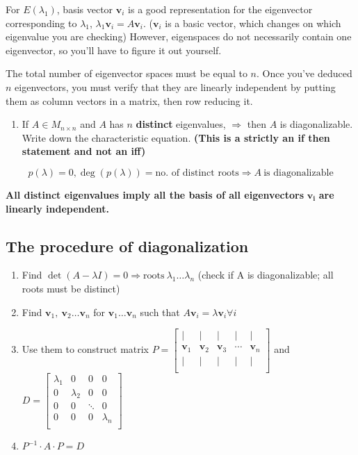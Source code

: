 \documentclass[12pt]{article}
\theoremstyle{plain}
\theoremstyle{remark}
\theoremstyle{definition}
\begin{document}
For \(E\left( \lambda_{1} \right)\), basis vector
\({\mathbf{v}}_{i}\) is a good representation for the eigenvector
corresponding to \(\lambda_{1}\),
\(\lambda_{1}{\mathbf{v}}_{i} = A{\mathbf{v}}_{i}\).
(\({\mathbf{v}}_{i}\) is a basic vector, which changes on which
eigenvalue you are checking) However, eigenspaces do not necessarily
contain one eigenvector, so you'll have to figure it out yourself.

The total number of eigenvector spaces must be equal to \(n\). Once
you've deduced \(n\) eigenvectors, you must verify that they are
linearly independent by putting them as column vectors in a matrix, then
row reducing it.

\begin{enumerate}
\def\labelenumi{\arabic{enumi}.}
\setcounter{enumi}{1}
\item
  If \(A \in M_{n \times n}\) and \(A\) has \(n\) \textbf{distinct}
  eigenvalues, \(\Rightarrow\) then \(A\) is diagonalizable. Write down
  the characteristic equation. \textbf{(This is a strictly an if then
  statement and not an iff)}
\end{enumerate}

\[p(\lambda) = 0,\deg\left( p(\lambda) \right) = \text{no.\ of\ distinct\ roots} \Rightarrow A\ \text{is\ diagonalizable}\]

\textbf{All distinct eigenvalues imply all the basis of all
eigenvectors} \({\mathbf{\mathbf{v}}}_{\mathbf{i}}\) \textbf{are
linearly independent.}


\subsection{The procedure of
diagonalization}

\begin{enumerate}
\def\labelenumi{\arabic{enumi}.}
\item
  Find
  \(\det(A - \lambda I) = 0 \Rightarrow \text{roots}\ \lambda_{1}\ldots\lambda_{n}\)
  (check if \(\text{A\ }\)is diagonalizable; all roots must be distinct)
\item
  Find
  \({\mathbf{v}}_{1},\ {\mathbf{v}}_{2}\ldots{\mathbf{v}}_{n}\)
  for \({\mathbf{v}}_{1}\ldots{\mathbf{v}}_{n}\) such that
  \(A{\mathbf{v}}_{i} = \lambda{\mathbf{v}}_{i}\forall i\)
\item
  Use them to construct matrix \(P = \begin{bmatrix}
   \mid & \mid & \mid & \mid & \mid \\
  {\mathbf{v}}_{1} & {\mathbf{v}}_{2} & {\mathbf{v}}_{3} & \cdots & {\mathbf{v}}_{n} \\
   \mid & \mid & \mid & \mid & \mid \\
  \end{bmatrix}\) and \(D = \begin{bmatrix}
  \lambda_{1} & 0 & 0 & 0 \\
  0 & \lambda_{2} & 0 & 0 \\
  0 & 0 & \ddots & 0 \\
  0 & 0 & 0 & \lambda_{n} \\
  \end{bmatrix}\)
\item
  \(P^{- 1} \cdot A \cdot P = D\)
\end{enumerate}
\end{document}
